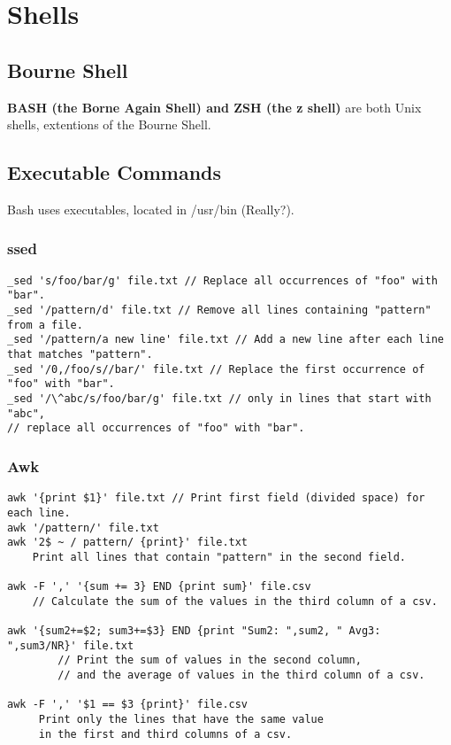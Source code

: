 
\chapter{Shells}

\section{Bourne Shell}

\textbf{BASH (the Borne Again Shell) and ZSH (the z shell)} are both Unix shells, extentions of the Bourne Shell.

\section{Executable Commands}

Bash uses executables, located in /usr/bin (Really?).

\subsection{ssed}

\begin{verbatim}
_sed 's/foo/bar/g' file.txt // Replace all occurrences of "foo" with "bar".
_sed '/pattern/d' file.txt // Remove all lines containing "pattern" from a file.
_sed '/pattern/a new line' file.txt // Add a new line after each line that matches "pattern".
_sed '/0,/foo/s//bar/' file.txt // Replace the first occurrence of "foo" with "bar".
_sed '/\^abc/s/foo/bar/g' file.txt // only in lines that start with "abc", 
// replace all occurrences of "foo" with "bar".
\end{verbatim}

\subsection{Awk}

\begin{verbatim}
awk '{print $1}' file.txt // Print first field (divided space) for each line.
awk '/pattern/' file.txt
awk '2$ ~ / pattern/ {print}' file.txt 
    Print all lines that contain "pattern" in the second field.

awk -F ',' '{sum += 3} END {print sum}' file.csv 
    // Calculate the sum of the values in the third column of a csv.

awk '{sum2+=$2; sum3+=$3} END {print "Sum2: ",sum2, " Avg3: ",sum3/NR}' file.txt
        // Print the sum of values in the second column,
        // and the average of values in the third column of a csv.

awk -F ',' '$1 == $3 {print}' file.csv 
     Print only the lines that have the same value
     in the first and third columns of a csv.
\end{verbatim}


